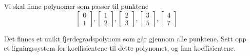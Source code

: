 \documentclass[11pt, a4paper, norsk]{NTNUoving}
\begin{document}
   \begin{oppgave}
       Vi skal finne polynomer som passer til punktene \[ \begin{bmatrix}
           0 \\
           1
       \end{bmatrix}, \begin{bmatrix}
           1 \\
           2
       \end{bmatrix}, \begin{bmatrix}
           2 \\
           3
       \end{bmatrix}, \begin{bmatrix}
           3 \\
           5
       \end{bmatrix}, \begin{bmatrix}
           4 \\
           7
       \end{bmatrix} \]

       \begin{punkt}
           Det finnes et unikt fjerdegradspolynom som går gjennom alle punktene. Sett opp et ligningssystem for koeffisientene til dette polynomet, og finn koeffisientene.


\end{punkt}
\end{oppgave}
\end{document}
